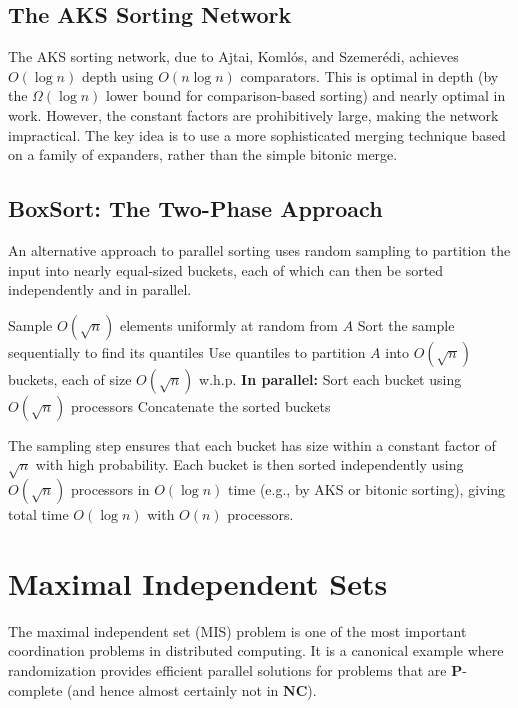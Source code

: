 \documentclass[twoside,12pt]{book}
\theoremstyle{plain}
\theoremstyle{definition}
\theoremstyle{remark}
\begin{document}
\subsection{The AKS Sorting Network}
\label{subsec:aks}

The AKS sorting network, due to Ajtai, Koml\'{o}s, and Szemer\'{e}di, achieves $O(\log n)$ depth using $O(n \log n)$ comparators. This is optimal in depth (by the $\Omega(\log n)$ lower bound for comparison-based sorting) and nearly optimal in work. However, the constant factors are prohibitively large, making the network impractical. The key idea is to use a more sophisticated merging technique based on a family of expanders, rather than the simple bitonic merge.

\subsection{BoxSort: The Two-Phase Approach}
\label{subsec:boxsort}

An alternative approach to parallel sorting uses random sampling to partition the input into nearly equal-sized buckets, each of which can then be sorted independently and in parallel.

\begin{algorithm}[H]
\caption{BoxSort}
\label{alg:boxsort}
\begin{algorithmic}[1]
\State Sample $O(\sqrt{n})$ elements uniformly at random from $A$
\State Sort the sample sequentially to find its quantiles
\State Use quantiles to partition $A$ into $O(\sqrt{n})$ buckets, each of size $O(\sqrt{n})$ w.h.p.
\State \textbf{In parallel:} Sort each bucket using $O(\sqrt{n})$ processors
\State Concatenate the sorted buckets
\EndProcedure
\end{algorithmic}
\end{algorithm}

The sampling step ensures that each bucket has size within a constant factor of $\sqrt{n}$ with high probability. Each bucket is then sorted independently using $O(\sqrt{n})$ processors in $O(\log n)$ time (e.g., by AKS or bitonic sorting), giving total time $O(\log n)$ with $O(n)$ processors.

\section{Maximal Independent Sets}
\label{sec:mis}

The maximal independent set (MIS) problem is one of the most important coordination problems in distributed computing. It is a canonical example where randomization provides efficient parallel solutions for problems that are $\mathbf{P}$-complete (and hence almost certainly not in $\mathbf{NC}$).
\end{document}
